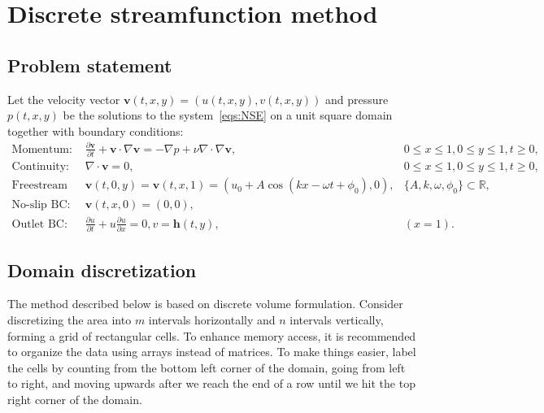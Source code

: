 \documentclass{article}
\begin{document}
\section{Discrete streamfunction method}\label{sec:discrete-streamfunction}

\subsection{Problem statement}
Let the velocity vector $\boldsymbol{v}(t,x,y)=(u(t,x,y),v(t,x,y))$ and pressure $p(t,x,y)$ be the solutions to the system~\eqref{eqs:NSE} on a unit square domain together with boundary conditions:
\begin{subequations}
\label{eqs:NSE-dsm-bl}
\begin{align}
\label{eqn:momentum}
\text{Momentum: }&\frac{\partial \boldsymbol{v}}{\partial t} + \boldsymbol{v} \cdot \nabla \boldsymbol{v} = -\nabla p + \nu \nabla \cdot \nabla \boldsymbol{v}, & 0\leq x \leq 1, 0\leq y \leq 1, t\geq0,\\
\label{eqn:continuity-dsm-bl}
\text{Continuity: }& \nabla \cdot \boldsymbol{v} = 0, & 0\leq x \leq 1, 0\leq y \leq 1, t\geq0, \\
\label{eqn:NSE-dsm-bl-bc-freestream}
\text{Freestream BC: } & \boldsymbol{v}(t,0,y)=\boldsymbol{v}(t,x,1)=\left({u_0} + A\cos\left( kx -\omega t + \phi_0 \right),0\right), & \{A,k,\omega, \phi_0\}\subset \mathbb{R},\\
\label{eqn:NSE-dsm-bl-bc-noslip}
\text{No-slip BC: } & \boldsymbol{v}(t,x,0)=(0,0), \\
\label{eqn:NSE-dsm-bl-bc-outlet}
\text{Outlet BC: } & \frac{\partial u}{\partial t}+u\frac{\partial u}{\partial x}=0, v=\boldsymbol{h}(t,y), &  (x=1).
\end{align}
\end{subequations}

\subsection{Domain discretization}\label{subsec:dsm-domain}

The method described below is based on discrete volume formulation. Consider discretizing the area into $m$ intervals horizontally and $n$ intervals vertically, forming a grid of rectangular cells. To enhance memory access, it is recommended to organize the data using arrays instead of matrices. To make things easier, label the cells by counting from the bottom left corner of the domain, going from left to right, and moving upwards after we reach the end of a row until we hit the top right corner of the domain.
\end{document}
